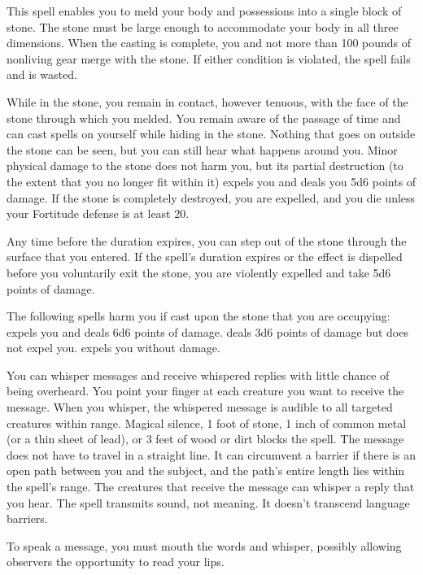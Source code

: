 \spelldur{\durlong}
\begin{spelleffect}
    This spell enables you to meld your body and possessions into a single block of stone. The stone must be large enough to accommodate your body in all three dimensions. When the casting is complete, you and not more than 100 pounds of nonliving gear merge with the stone. If either condition is violated, the spell fails and is wasted.
    \par While in the stone, you remain in contact, however tenuous, with the face of the stone through which you melded. You remain aware of the passage of time and can cast spells on yourself while hiding in the stone. Nothing that goes on outside the stone can be seen, but you can still hear what happens around you. Minor physical damage to the stone does not harm you, but its partial destruction (to the extent that you no longer fit within it) expels you and deals you 5d6 points of damage. If the stone is completely destroyed, you are expelled, and you die unless your Fortitude defense is at least 20.
    \par Any time before the duration expires, you can step out of the stone through the surface that you entered. If the spell's duration expires or the effect is dispelled before you voluntarily exit the stone, you are violently expelled and take 5d6 points of damage.
\end{spelleffect}
\begin{spellnotes}
    The following spells harm you if cast upon the stone that you are occupying:  expels you and deals 6d6 points of damage.  deals 3d6 points of damage but does not expel you.  expels you without damage.
\end{spellnotes}

\spelldur{\durlong}
\begin{spelleffect}
    You can whisper messages and receive whispered replies with little chance of being overheard. You point your finger at each creature you want to receive the message. When you whisper, the whispered message is audible to all targeted creatures within range. Magical silence, 1 foot of stone, 1 inch of common metal (or a thin sheet of lead), or 3 feet of wood or dirt blocks the spell. The message does not have to travel in a straight line. It can circumvent a barrier if there is an open path between you and the subject, and the path's entire length lies within the spell's range. The creatures that receive the message can whisper a reply that you hear. The spell transmits sound, not meaning. It doesn't transcend language barriers.
\end{spelleffect}
\begin{spellnotes}
    To speak a message, you must mouth the words and whisper, possibly allowing observers the opportunity to read your lips.
\end{spellnotes}

